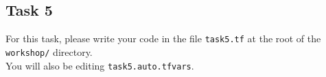 \subsection{Task 5}\label{sec:task5}

\begin{note}
For this task, please write your code in the file \texttt{task5.tf}
at the root of the \texttt{workshop/} directory.\\
You will also be editing \texttt{task5.auto.tfvars}.
\end{note}


